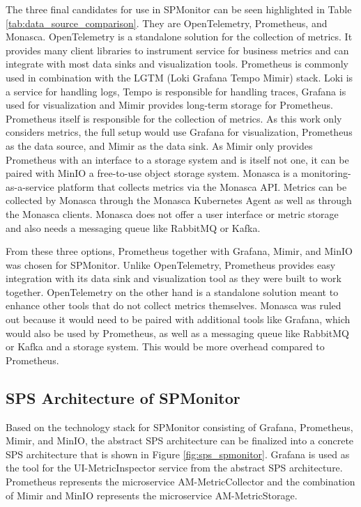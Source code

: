 The three final candidates for use in SPMonitor can be seen highlighted in Table \ref{tab:data_source_comparison}.
They are OpenTelemetry, Prometheus, and Monasca.
OpenTelemetry is a standalone solution for the collection of metrics. 
It provides many client libraries to instrument service for business metrics and can integrate
with most data sinks and visualization tools.
Prometheus is commonly used in combination with the LGTM (Loki Grafana Tempo Mimir) stack.
Loki is a service for handling logs, Tempo is responsible for handling traces, Grafana is used for visualization and Mimir provides
long-term storage for Prometheus. Prometheus itself is responsible for the collection of metrics.
As this work only considers metrics, the full setup would use Grafana for visualization, Prometheus as the data source, and Mimir
as the data sink. As Mimir only provides Prometheus with an interface to a storage system and is itself not one, it can be paired with MinIO
a free-to-use object storage system.
Monasca is a monitoring-as-a-service platform that collects metrics via the Monasca API.
Metrics can be collected by Monasca through the Monasca Kubernetes Agent as well as through
the Monasca clients. Monasca does not offer a user interface or metric storage
and also needs a messaging queue like RabbitMQ or Kafka.

From these three options, Prometheus together with Grafana, Mimir, and MinIO was chosen for SPMonitor.
Unlike OpenTelemetry, Prometheus provides easy integration with its data sink and visualization tool as
they were built to work together. OpenTelemetry on the other hand is a standalone solution meant to enhance
other tools that do not collect metrics themselves.
Monasca was ruled out because it would need to be paired with additional tools like Grafana,
which would also be used by Prometheus, as well as a messaging queue like RabbitMQ or Kafka and
a storage system. This would be more overhead compared to Prometheus.

\subsection{SPS Architecture of SPMonitor}

Based on the technology stack for SPMonitor consisting of Grafana, Prometheus, Mimir, and MinIO,
the abstract SPS architecture can be finalized into a concrete SPS architecture that is shown in
Figure \ref{fig:sps_spmonitor}. Grafana is used as the tool for the UI-MetricInspector
service from the abstract SPS architecture. Prometheus represents the microservice AM-MetricCollector
and the combination of Mimir and MinIO represents the microservice AM-MetricStorage.

